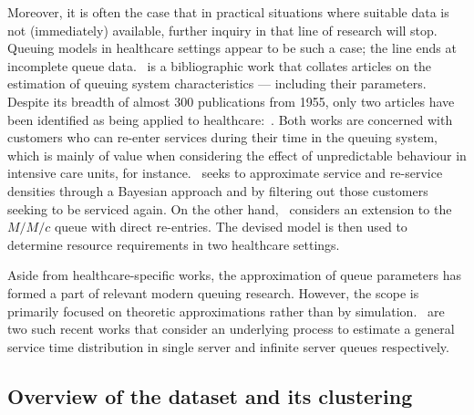 Moreover, it is often the case that in practical situations where suitable data
is not (immediately) available, further inquiry in that line of research will
stop. Queuing models in healthcare settings appear to be such a case; the line
ends at incomplete queue data.~\cite{Asanjarani2017} is a bibliographic work
that collates articles on the estimation of queuing system characteristics ---
including their parameters. Despite its breadth of almost 300 publications from
1955, only two articles have been identified as being applied to
healthcare:~\cite{Mohammadi2012,Yom2014}. Both works are concerned with
customers who can re-enter services during their time in the queuing system,
which is mainly of value when considering the effect of unpredictable behaviour
in intensive care units, for instance.~\cite{Mohammadi2012} seeks to approximate
service and re-service densities through a Bayesian approach and by filtering
out those customers seeking to be serviced again. On the other
hand,~\cite{Yom2014} considers an extension to the \(M/M/c\) queue with direct
re-entries. The devised model is then used to determine resource requirements in
two healthcare settings.

Aside from healthcare-specific works, the approximation of queue parameters has
formed a part of relevant modern queuing research. However, the scope is
primarily focused on theoretic approximations rather than by
simulation.~\cite{Djabali2018,Goldenshluger2016} are two such recent works that
consider an underlying process to estimate a general service time distribution
in single server and infinite server queues respectively.

\subsection{Overview of the dataset and its clustering}\label{subsec:overview}

